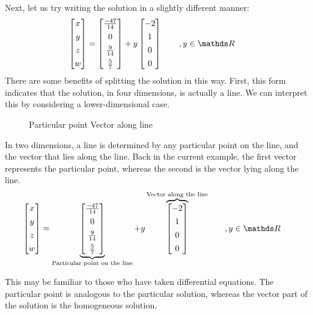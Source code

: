 \documentclass[11pt]{article}
\begin{document}
Next, let us try writing the solution in a slightly different manner:
\begin{align*}
\begin{bmatrix}
x
\\[.4em]
y
\\[.4em]
z
\\[.4em]
w
\end{bmatrix}
&=
\begin{bmatrix}
\frac{-47}{14}
\\[.4em]
0
\\[.4em]
\frac{9}{14}
\\[.4em]
\frac{5}{7}
\end{bmatrix}
+
y
\begin{bmatrix}
-2
\\[.4em]
1
\\[.4em]
0
\\[.4em]
0
\end{bmatrix}
\qquad ,y \in \bbR
\end{align*}
There are some benefits of splitting the solution in this way. First, this form indicates that the solution, in four dimensions, is actually a line. We can interpret this by considering a lower-dimensional case.

\begin{figure}[H]
\centering
Particular point
Vector along line
\end{figure}

In two dimensions, a line is determined by any particular point on the line, and the vector that lies along the line. Back in the current example, the first vector represents the particular point, whereas the second is the vector lying along the line.
\begin{align*}
\begin{bmatrix}
x
\\[.4em]
y
\\[.4em]
z
\\[.4em]
w
\end{bmatrix}
&=
\underbrace{
\begin{bmatrix}
\frac{-47}{14}
\\[.4em]
0
\\[.4em]
\frac{9}{14}
\\[.4em]
\frac{5}{7}
\end{bmatrix}
}_{\text{Particular point on the line}}
+
y
\overbrace{
\begin{bmatrix}
-2
\\[.4em]
1
\\[.4em]
0
\\[.4em]
0
\end{bmatrix}
}^{\text{Vector along the line}}
\qquad ,y \in \bbR
\end{align*}

This may be familiar to those who have taken differential equations. The particular point is analogous to the particular solution, whereas the vector part of the solution is the homogeneous solution.
\end{document}

